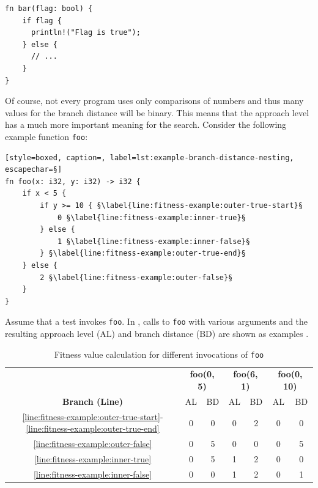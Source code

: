 \documentclass[paper=a4,%
  twoside,%
  BCOR4mm,%
  abstract=true,%
  toc=bibliography,%
  chapterprefix=true,%
  toc=bibliographynumbered,%
  open=right,%
  english,%
  pagesize=pdftex]{scrreprt}
\begin{document}
\begin{lstlisting}[style=boxed, caption={Computation of local branch distance for a boolean flag that we do not know where it came from}, label=lst:example-branch-distance-boolean-flag]
fn bar(flag: bool) {
    if flag {
      println!("Flag is true"); 
    } else {
      // ...
    }
}
\end{lstlisting}

Of course, not every program uses only comparisons of numbers and thus many values for the branch distance will be binary. This means that the approach level has a much more important meaning for the search. Consider the following example function \texttt{foo}:

\begin{lstlisting}[style=boxed, caption=, label=lst:example-branch-distance-nesting, escapechar=§]
fn foo(x: i32, y: i32) -> i32 {
    if x < 5 {
        if y >= 10 { §\label{line:fitness-example:outer-true-start}§
            0 §\label{line:fitness-example:inner-true}§
        } else {
            1 §\label{line:fitness-example:inner-false}§
        } §\label{line:fitness-example:outer-true-end}§
    } else {
        2 §\label{line:fitness-example:outer-false}§
    }
}
\end{lstlisting}

Assume that a test invokes \texttt{foo}. In , calls to \texttt{foo} with various arguments and the resulting approach level (AL) and branch distance (BD) are shown as examples .
\begin{table}[h!]
\centering
\begin{tabular}{c|cc|cc|cc}
\hline
& \multicolumn{2}{c|}{\textbf{foo(0, 5)}}                     & \multicolumn{2}{c|}{\textbf{foo(6, 1)}}                      & \multicolumn{2}{c}{\textbf{foo(0, 10)}}                     \\
\cline{2-7}
\textbf{Branch (Line)} & AL & BD & AL & BD & AL & BD \\
\hline
\ref{line:fitness-example:outer-true-start}-\ref{line:fitness-example:outer-true-end} & 0                       & 0                        & 0                       & 2                        & 0                       & 0                        \\
\ref{line:fitness-example:outer-false}                      & 0                       & 5                        & 0                       & 0                        & 0                       & 5                        \\
\ref{line:fitness-example:inner-true}                      & 0                       & 5                        & 1                       & 2                        & 0                       & 0                        \\
\ref{line:fitness-example:inner-false}                      & 0                       & 0                        & 1                       & 2                        & 0                       & 1 \\ \hline
\end{tabular}
\caption{Fitness value calculation for different invocations of \texttt{foo}}
\label{tab:example-fitness-calculation}
\end{table}
\end{document}
